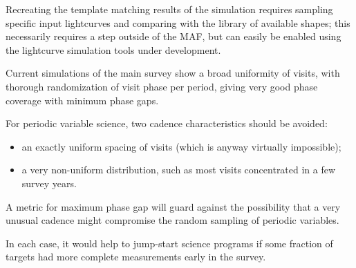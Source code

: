 Recreating the template matching results of the
\citet{2012AJ....144....9O} simulation requires sampling specific input
lightcurves and comparing with the library of available shapes; this
necessarily requires a step outside of the MAF, but can easily be
enabled using the lightcurve simulation tools under development.

Current simulations of the main survey show a broad uniformity of
visits, with thorough randomization of visit phase per period, giving
very good phase coverage with minimum phase gaps.


%

For periodic variable science, two cadence characteristics should be avoided:
\begin{itemize}
\item an exactly uniform spacing of visits (which is anyway virtually impossible); \
\item a very non-uniform distribution, such as most visits concentrated in a few survey years.
 \end{itemize}

A metric for maximum phase gap will guard against the possibility that a
very unusual cadence might compromise the random sampling of periodic
variables.

In each case, it would help to jump-start science programs if some
fraction of targets had more complete measurements early in the survey.



\navigationbar
